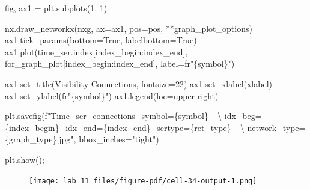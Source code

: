 \documentclass[
  letterpaper,
]{report}
\newenvironment{Shaded}{\begin{snugshade}}{\end{snugshade}}
\newcommand{\CharTok}[1]{\textcolor[rgb]{0.13,0.47,0.30}{#1}}
\newcommand{\DecValTok}[1]{\textcolor[rgb]{0.68,0.00,0.00}{#1}}
\newcommand{\NormalTok}[1]{\textcolor[rgb]{0.00,0.23,0.31}{#1}}
\newcommand{\OperatorTok}[1]{\textcolor[rgb]{0.37,0.37,0.37}{#1}}
\newcommand{\SpecialCharTok}[1]{\textcolor[rgb]{0.37,0.37,0.37}{#1}}
\newcommand{\SpecialStringTok}[1]{\textcolor[rgb]{0.13,0.47,0.30}{#1}}
\newcommand{\StringTok}[1]{\textcolor[rgb]{0.13,0.47,0.30}{#1}}
\newcommand{\VariableTok}[1]{\textcolor[rgb]{0.07,0.07,0.07}{#1}}
\newcommand{\VerbatimStringTok}[1]{\textcolor[rgb]{0.13,0.47,0.30}{#1}}
\begin{document}
\begin{Shaded}
\begin{Highlighting}[]
\NormalTok{fig, ax1 }\OperatorTok{=}\NormalTok{ plt.subplots(}\DecValTok{1}\NormalTok{, }\DecValTok{1}\NormalTok{)}

\NormalTok{nx.draw\_networkx(nxg, ax}\OperatorTok{=}\NormalTok{ax1, pos}\OperatorTok{=}\NormalTok{pos, }\OperatorTok{**}\NormalTok{graph\_plot\_options)}
\NormalTok{ax1.tick\_params(bottom}\OperatorTok{=}\VariableTok{True}\NormalTok{, labelbottom}\OperatorTok{=}\VariableTok{True}\NormalTok{)}
\NormalTok{ax1.plot(time\_ser.index[index\_begin:index\_end], }
\NormalTok{         for\_graph\_plot[index\_begin:index\_end], }
\NormalTok{         label}\OperatorTok{=}\VerbatimStringTok{fr"}\SpecialCharTok{\{}\NormalTok{symbol}\SpecialCharTok{\}}\VerbatimStringTok{"}\NormalTok{)}

\NormalTok{ax1.set\_title(}\StringTok{\textquotesingle{}Visibility Connections\textquotesingle{}}\NormalTok{, fontsize}\OperatorTok{=}\DecValTok{22}\NormalTok{)}
\NormalTok{ax1.set\_xlabel(xlabel)}
\NormalTok{ax1.set\_ylabel(}\VerbatimStringTok{fr"}\SpecialCharTok{\{}\NormalTok{symbol}\SpecialCharTok{\}}\VerbatimStringTok{"}\NormalTok{)}
\NormalTok{ax1.legend(loc}\OperatorTok{=}\StringTok{\textquotesingle{}upper right\textquotesingle{}}\NormalTok{)}

\NormalTok{plt.savefig(}\SpecialStringTok{f"Time\_ser\_connections\_symbol=}\SpecialCharTok{\{}\NormalTok{symbol}\SpecialCharTok{\}}\SpecialStringTok{\_ }\CharTok{\textbackslash{}}
\SpecialStringTok{    idx\_beg=}\SpecialCharTok{\{}\NormalTok{index\_begin}\SpecialCharTok{\}}\SpecialStringTok{\_idx\_end=}\SpecialCharTok{\{}\NormalTok{index\_end}\SpecialCharTok{\}}\SpecialStringTok{\_sertype=}\SpecialCharTok{\{}\NormalTok{ret\_type}\SpecialCharTok{\}}\SpecialStringTok{\_ }\CharTok{\textbackslash{}}
\SpecialStringTok{    network\_type=}\SpecialCharTok{\{}\NormalTok{graph\_type}\SpecialCharTok{\}}\SpecialStringTok{.jpg"}\NormalTok{, bbox\_inches}\OperatorTok{=}\StringTok{"tight"}\NormalTok{)}

\NormalTok{plt.show()}\OperatorTok{;} 
\end{Highlighting}
\end{Shaded}

\begin{figure}[H]

{\centering \texttt{[image: lab\_11\_files/figure-pdf/cell-34-output-1.png]}

}

\end{figure}
\end{document}
